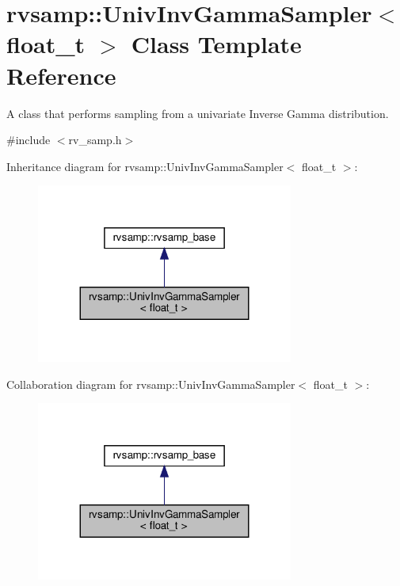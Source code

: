 \hypertarget{classrvsamp_1_1UnivInvGammaSampler}{}\section{rvsamp\+:\+:Univ\+Inv\+Gamma\+Sampler$<$ float\+\_\+t $>$ Class Template Reference}
\label{classrvsamp_1_1UnivInvGammaSampler}


A class that performs sampling from a univariate Inverse Gamma distribution.  




{\ttfamily \#include $<$rv\+\_\+samp.\+h$>$}



Inheritance diagram for rvsamp\+:\+:Univ\+Inv\+Gamma\+Sampler$<$ float\+\_\+t $>$\+:
\nopagebreak
\begin{figure}[H]
\begin{center}
\leavevmode
\includegraphics[width=239pt]{classrvsamp_1_1UnivInvGammaSampler__inherit__graph}
\end{center}
\end{figure}


Collaboration diagram for rvsamp\+:\+:Univ\+Inv\+Gamma\+Sampler$<$ float\+\_\+t $>$\+:
\nopagebreak
\begin{figure}[H]
\begin{center}
\leavevmode
\includegraphics[width=239pt]{classrvsamp_1_1UnivInvGammaSampler__coll__graph}
\end{center}
\end{figure}
